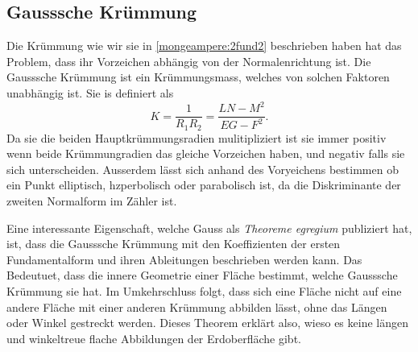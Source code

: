 \subsection{Gausssche Krümmung}
Die Krümmung wie wir sie in \eqref{mongeampere:2fund2} beschrieben haben hat das Problem, dass
ihr Vorzeichen abhängig von der Normalenrichtung ist.
Die Gausssche Krümmung ist ein Krümmungsmass, welches von solchen Faktoren unabhängig ist.
Sie is definiert als 
\begin{equation}
  K = \frac{1}{R_1 R_2} = \frac{LN-M^2}{EG-F^2}.
  \label{mongeampere:gausskrumm}
\end{equation}
Da sie die beiden Hauptkrümmungsradien mulitipliziert ist sie immer positiv wenn 
beide Krümmungradien das gleiche Vorzeichen haben, und negativ falls sie sich unterscheiden.
Ausserdem lässt sich anhand des Voryeichens bestimmen ob ein Punkt elliptisch, hzperbolisch oder parabolisch 
ist, da die Diskriminante der zweiten Normalform im Zähler ist.

Eine interessante Eigenschaft, welche Gauss als \emph{Theoreme egregium} publiziert hat, ist, dass
die Gausssche Krümmung mit den Koeffizienten der ersten Fundamentalform und ihren Ableitungen beschrieben werden kann.
Das Bedeutuet, dass die innere Geometrie einer Fläche bestimmt, welche Gausssche Krümmung sie hat.
Im Umkehrschluss folgt, dass sich eine Fläche nicht auf eine andere Fläche mit einer anderen Krümmung abbilden
lässt, ohne das Längen oder Winkel gestreckt werden.
Dieses Theorem erklärt also, wieso es keine längen und winkeltreue flache Abbildungen der Erdoberfläche gibt.

